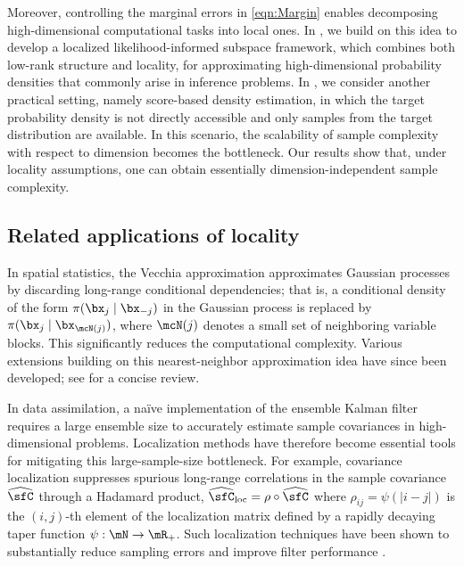 \documentclass[11pt]{article}
\begin{document}


Moreover, controlling the marginal errors in \eqref{eqn:Margin} enables decomposing high-dimensional computational tasks into local ones. In , we build on this idea to develop a localized likelihood-informed subspace framework, which combines both low-rank structure and locality, for approximating high-dimensional probability densities that commonly arise in inference problems. In , we consider another practical setting, namely score-based density estimation, in which the target probability density is not directly accessible and only samples from the target distribution are available. In this scenario, the scalability of sample complexity with respect to dimension becomes the bottleneck. Our results show that, under locality assumptions, one can obtain essentially dimension-independent sample complexity.



\subsection{Related applications of locality}
\label{sec:related_work}

In spatial statistics, the Vecchia approximation \cite{MR964183} approximates Gaussian processes by discarding long-range conditional dependencies; that is, a conditional density of the form \(\pi(\bx_{j} \mid \bx_{-j})\) in the Gaussian process is replaced by \(\pi(\bx_{j} \mid \bx_{\mcN(j)})\), where $\mcN(j)$ denotes a small set of neighboring variable blocks. This significantly reduces the computational complexity. Various extensions building on this nearest-neighbor approximation idea have since been developed; see \cite{MR3538706} for a concise review.



In data assimilation, a naïve implementation of the ensemble Kalman filter requires a large ensemble size to accurately estimate sample covariances in high-dimensional problems.
%
Localization methods \cite{2001MWRv..129..123H,2001MWRv129.7690} have therefore become essential tools for mitigating this large-sample-size bottleneck.
For example, covariance localization suppresses spurious long-range correlations in the sample covariance $\widehat{\sfC}$ through a Hadamard product,
\(
    \widehat{\sfC}_{\mathrm{loc}} = \rho \circ \widehat{\sfC}
\)
where $ \rho_{ij} = \psi(|i-j|) $ is the $(i,j)$-th element of the localization matrix defined by a rapidly decaying taper function $\psi : \mN \to \mR_{+}$.
Such localization techniques have been shown to substantially reduce sampling errors and improve filter performance \cite{2001MWRv..129..123H,2001MWRv129.7690,MR3375889}.
\end{document}
